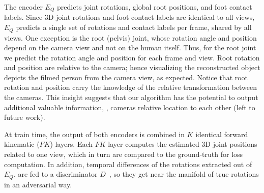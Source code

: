The encoder $E_Q$ predicts joint rotations, global root positions, and foot contact labels. 
Since 3D joint rotations and foot contact labels are identical to all views, $E_Q$ predicts a single set of rotations and contact labels per frame, shared by all views.
One exception is the root (pelvis) joint, whose rotation angle and position depend on the camera view and not on the human itself. Thus, for the root joint we predict the rotation angle and position for each frame and view. Root rotation and position are relative to the camera; hence visualizing the reconstructed object depicts the filmed person from the camera view, as expected.
Notice that root rotation and position carry the knowledge of the relative transformation between the cameras.
This insight suggests that our algorithm has the potential to output additional valuable information, \eg, cameras relative location to each other (left to future work).

At train time, the output of both encoders is combined in $K$ identical forward kinematic ($FK$) layers. 
Each $FK$ layer computes the estimated 3D joint positions related to one view, which in turn are 
 compared to the ground-truth for loss computation. 
In addition, temporal differences of the rotations extracted out of $E_Q$, are fed to a discriminator $D$~\cite{Kanazawa:2018}, so they get near the manifold of true rotations in an adversarial way. 


